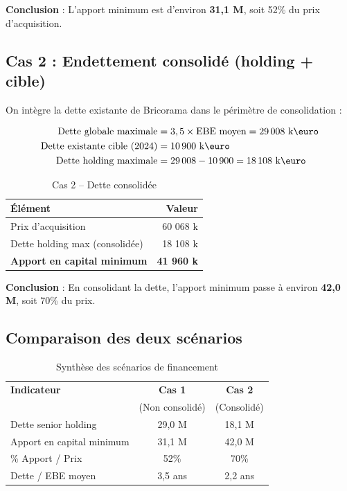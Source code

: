 \documentclass{rapportECL}
\begin{document}
\textbf{Conclusion} : L'apport minimum est d'environ \textbf{31,1 M\text{\euro}}, soit 52\% du prix d'acquisition.

\subsection{Cas 2 : Endettement consolidé (holding + cible)}

On intègre la dette existante de Bricorama dans le périmètre de consolidation :

\begin{align}
\text{Dette globale maximale} &= 3,5 \times \text{EBE moyen} = 29\,008 \text{ k\text{\euro}} \\
\text{Dette existante cible (2024)} &= 10\,900 \text{ k\text{\euro}} \\
\text{Dette holding maximale} &= 29\,008 - 10\,900 = 18\,108 \text{ k\text{\euro}}
\end{align}

\begin{table}[H]
\centering
\caption{Cas 2 -- Dette consolidée}
\begin{tabular}{l r}
\toprule
\textbf{Élément} & \textbf{Valeur} \\
\midrule
Prix d'acquisition & 60 068 k\text{\euro} \\
Dette holding max (consolidée) & 18 108 k\text{\euro} \\
\textbf{Apport en capital minimum} & \textbf{41 960 k\text{\euro}} \\
\bottomrule
\end{tabular}
\end{table}

\textbf{Conclusion} : En consolidant la dette, l'apport minimum passe à environ \textbf{42,0 M\text{\euro}}, soit 70\% du prix.

\subsection{Comparaison des deux scénarios}

\begin{table}[H]
\centering
\caption{Synthèse des scénarios de financement}
\begin{tabular}{l c c}
\toprule
\textbf{Indicateur} & \textbf{Cas 1} & \textbf{Cas 2} \\
& (Non consolidé) & (Consolidé) \\
\midrule
Dette senior holding & 29,0 M\text{\euro} & 18,1 M\text{\euro} \\
Apport en capital minimum & 31,1 M\text{\euro} & 42,0 M\text{\euro} \\
\% Apport / Prix & 52\% & 70\% \\
Dette / EBE moyen & 3,5 ans & 2,2 ans \\
\bottomrule
\end{tabular}
\end{table}
\end{document}
